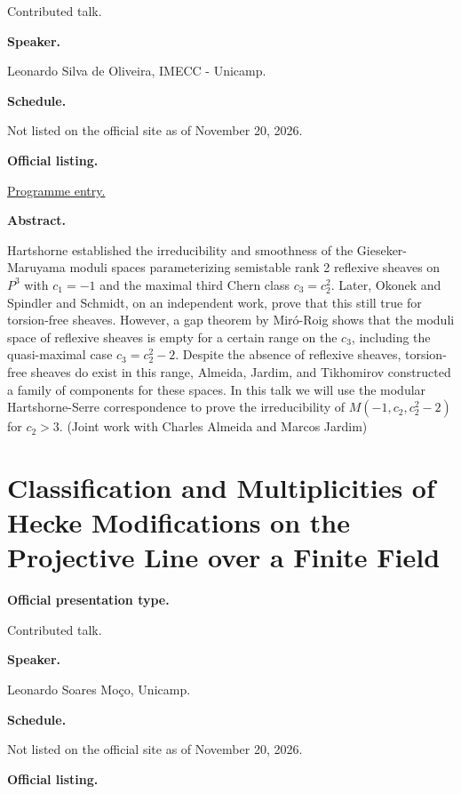 Contributed talk.

\medskip\noindent
{\bf Speaker.}

Leonardo Silva de Oliveira, IMECC - Unicamp.

\medskip\noindent
{\bf Schedule.}

Not listed on the official site as of
November 20, 2026.

\medskip\noindent
{\bf Official listing.}

\href{%
https://sites.google.com/view/%
geoalgcompluff/legal/%
legal-2027-resumos#h.dant8g3oe5ea%
}{Programme entry.}

\medskip\noindent
{\bf Abstract.}

Hartshorne established the irreducibility and
smoothness of the Gieseker-Maruyama moduli
spaces parameterizing semistable rank 2
reflexive sheaves on $P^3$ with $c_1=-1$ and
the maximal third Chern class $c_3 = c_2^2$.
Later, Okonek and Spindler and Schmidt, on an
independent work, prove that this still true
for torsion-free sheaves. However, a gap
theorem by Miró-Roig shows that the moduli
space of reflexive sheaves is empty for a
certain range on the $c_3$, including the
quasi-maximal case $c_3 = c_2^2 - 2$. Despite
the absence of reflexive sheaves,
torsion-free sheaves do exist in this range,
Almeida, Jardim, and Tikhomirov constructed a
family of components for these spaces. In
this talk we will use the modular
Hartshorne-Serre correspondence to prove the
irreducibility of $M(-1, c_2, c_2^2 - 2)$ for
$c_2 >3$. (Joint work with Charles Almeida
and Marcos Jardim)

\section{Classification and Multiplicities of
Hecke Modifications on the Projective Line
over a Finite Field}
\label{section-classification-and}

\medskip\noindent
{\bf Official presentation type.}

Contributed talk.

\medskip\noindent
{\bf Speaker.}

Leonardo Soares Moço, Unicamp.

\medskip\noindent
{\bf Schedule.}

Not listed on the official site as of
November 20, 2026.

\medskip\noindent
{\bf Official listing.}

